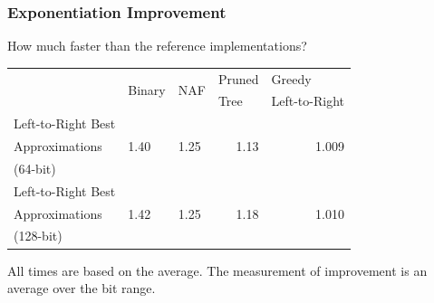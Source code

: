 \documentclass{beamer}
\newcommand{\smallfont}{\fontsize{6pt}{7.2}\selectfont}
\begin{document}
\begin{frame}
\frametitle{Exponentiation Improvement}
How much faster than the reference implementations?
\begin{table}
\centering
\begin{tabular}{ | l | l | l | l | l | }
\hline
& \multirow{2}{*}{Binary} & \multirow{2}{*}{NAF} & Pruned & Greedy \\
& & & Tree & Left-to-Right \\
\hline
Left-to-Right Best & \multirow{3}{*}{1.40} & \multirow{3}{*}{1.25} & \multicolumn{1}{|r|}{\multirow{3}{*}{1.13}} & \multicolumn{1}{|r|}{\multirow{3}{*}{1.009}} \\
Approximations & & & &\\
(64-bit) & & & &\\

\hline

Left-to-Right Best & \multirow{3}{*}{1.42} & \multirow{3}{*}{1.25} & \multicolumn{1}{|r|}{\multirow{3}{*}{1.18}} & \multicolumn{1}{|r|}{\multirow{3}{*}{1.010}} \\
Approximations & & & &\\
(128-bit) & & & &\\

\hline
\end{tabular}
\end{table}

\bigskip
\smallfont
All times are based on the average.  The measurement of improvement is an average over the bit range.
\end{frame}
\end{document}
